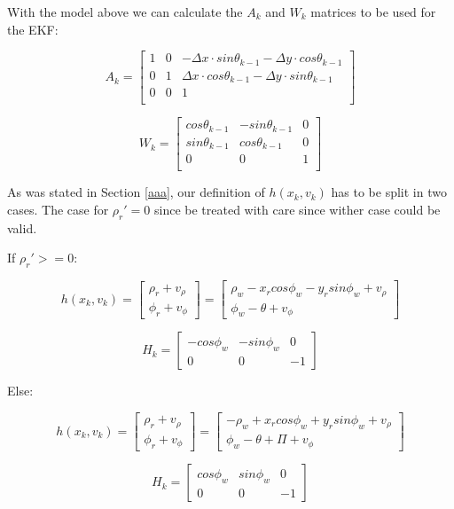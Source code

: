 \documentclass[journal]{IEEEtran}
\begin{document}
With the model above we can calculate the $A_k$ and $W_k$ matrices to be used for the EKF:

\[
A_k = 
\begin{bmatrix}
1 & 0 & -\Delta x\cdot sin \theta_{k-1} - \Delta y \cdot cos \theta_{k-1} \\
0 & 1 & \Delta x\cdot cos \theta_{k-1} - \Delta y \cdot sin \theta_{k-1} \\
0 & 0 & 1 \\
\end{bmatrix}
\]

\[
W_k = 
\begin{bmatrix}
cos \theta_{k-1} & -sin \theta_{k-1} & 0 \\
sin \theta_{k-1} & cos \theta_{k-1} & 0 \\
0 & 0 & 1 \\
\end{bmatrix}
\]

As was stated in Section \ref{aaa}, our definition of $h(x_k,v_k)$ has to be split in two cases. The case for $\rho_r ' = 0$ since be treated with care since wither case could be valid.

\newpage

If $\rho_r ' >= 0$:

\[
h(x_k,v_k) = 
\begin{bmatrix}
\rho_r + v_\rho \\
\phi_r + v_\phi
\end{bmatrix}
=
\begin{bmatrix}
\rho_w - x_r cos\phi_w - y_r sin \phi_w + v_\rho \\
\phi_w - \theta + v_\phi
\end{bmatrix}
\]

\[
H_k = 
\begin{bmatrix}
-cos\phi_w & -sin \phi_w & 0 \\
0 & 0 & -1
\end{bmatrix}
\]

Else:

\[
h(x_k,v_k) = 
\begin{bmatrix}
\rho_r + v_\rho \\
\phi_r + v_\phi
\end{bmatrix}
=
\begin{bmatrix}
-\rho_w + x_r cos\phi_w + y_r sin \phi_w + v_\rho \\
\phi_w - \theta + \Pi + v_\phi
\end{bmatrix}
\]

\[
H_k = 
\begin{bmatrix}
cos\phi_w & sin \phi_w & 0 \\
0 & 0 & -1
\end{bmatrix}
\]


%
%
\end{document}
